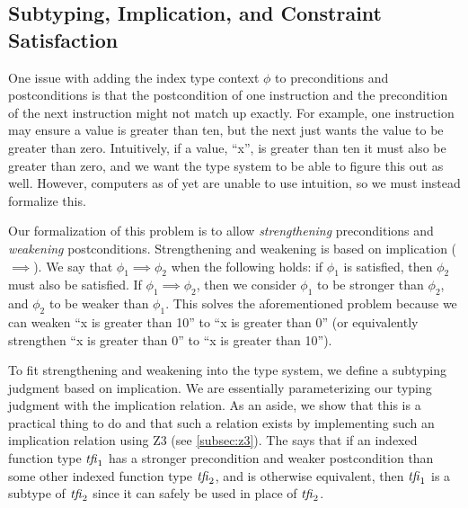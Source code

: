 \subsection{Subtyping, Implication, and Constraint Satisfaction}
\label{subsec:subtyping}
One issue with adding the index type context $\phi$ to preconditions and postconditions is that the postcondition of one instruction and the precondition of the next instruction might not match up exactly.
For example, one instruction may ensure a value is greater than ten, but the next just wants the value to be greater than zero.
Intuitively, if a value, ``x'', is greater than ten it must also be greater than zero, and we want the \name type system to be able to figure this out as well.
However, computers as of yet are unable to use intuition, so we must instead formalize this.

Our formalization of this problem is to allow \emph{strengthening} preconditions and \emph{weakening} postconditions.
Strengthening and weakening is based on implication ($\implies$).
We say that $\phi_1 \implies \phi_2$ when the following holds: if $\phi_1$ is satisfied, then $\phi_2$ must also be satisfied.
If $\phi_1 \implies \phi_2$, then we consider $\phi_1$ to be stronger than $\phi_2$, and $\phi_2$ to be weaker than $\phi_1$.
This solves the aforementioned problem because we can weaken ``x is greater than 10'' to ``x is greater than 0'' (or equivalently strengthen ``x is greater than 0'' to ``x is greater than 10'').

To fit strengthening and weakening into the type system, we define a subtyping judgment based on implication.
We are essentially parameterizing our typing judgment with the implication relation.
As an aside, we show that this is a practical thing to do and that such a relation exists by implementing such an implication relation using Z3 (see \autoref{subsec:z3}).
The  says that if an indexed function type $\tfi_1$ has a stronger precondition and weaker postcondition than some other indexed function type $\tfi_2$, and is otherwise equivalent, then $\tfi_1$ is a subtype of $\tfi_2$ since it can safely be used in place of $\tfi_2$.

\begin{mathpar}
\end{mathpar}

